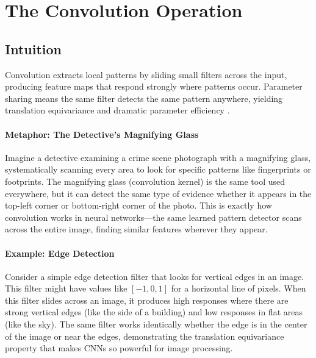 
\section{The Convolution Operation}
\label{sec:convolution}


\subsection*{Intuition}
Convolution extracts local patterns by sliding small filters across the input, producing feature maps that respond strongly where patterns occur. Parameter sharing means the same filter detects the same pattern anywhere, yielding translation equivariance  and dramatic parameter efficiency \cite{GoodfellowEtAl2016,Prince2023}.

\paragraph{Metaphor: The Detective's Magnifying Glass}
Imagine a detective examining a crime scene photograph with a magnifying glass, systematically scanning every area to look for specific patterns like fingerprints or footprints. The magnifying glass (convolution kernel) is the same tool used everywhere, but it can detect the same type of evidence whether it appears in the top-left corner or bottom-right corner of the photo. This is exactly how convolution works in neural networks—the same learned pattern detector scans across the entire image, finding similar features wherever they appear.

\paragraph{Example: Edge Detection}
Consider a simple edge detection filter that looks for vertical edges in an image. This filter might have values like $[-1, 0, 1]$ for a horizontal line of pixels. When this filter slides across an image, it produces high responses where there are strong vertical edges (like the side of a building) and low responses in flat areas (like the sky). The same filter works identically whether the edge is in the center of the image or near the edges, demonstrating the translation equivariance property that makes CNNs so powerful for image processing.

